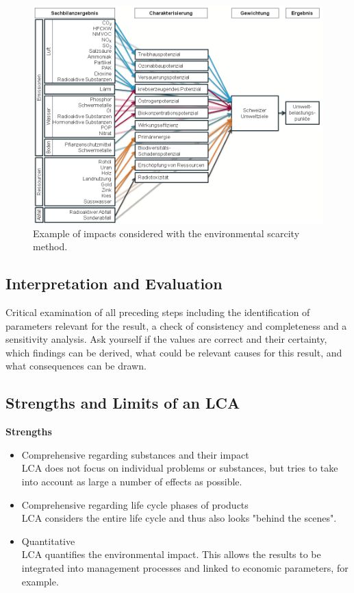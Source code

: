 \documentclass[11pt]{article}
\theoremstyle{definition}
\begin{document}
\begin{figure}[H]
	\centering
	\includegraphics[width=0.8\linewidth]{img/ecological_scarcity_method_example}
	\caption{Example of impacts considered with the environmental scarcity method.}
	\label{fig:ecologicalscarcitymethodexample}
\end{figure}

\subsection{Interpretation and Evaluation}
Critical examination of all preceding steps including the identification of parameters relevant for the result, a check of consistency and completeness and a sensitivity analysis. Ask yourself if the values are correct and their certainty, which findings can be derived, what could be relevant causes for this result, and what consequences can be drawn.

\subsection{Strengths and Limits of an LCA}
\textbf{Strengths}
\begin{itemize}
	\item Comprehensive regarding substances and their impact\\
	LCA does not focus on individual problems or substances, but tries to take into account as large a number of effects as possible.
	\item Comprehensive regarding life cycle phases of products\\
	LCA considers the entire life cycle and thus also looks "behind the scenes".
	\item Quantitative\\
	LCA quantifies the environmental impact. This allows the results to be integrated into management processes and linked to economic parameters, for example.
\end{itemize}
\end{document}

